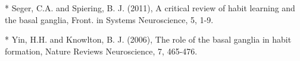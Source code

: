 * Seger, C.A. and Spiering, B. J. (2011), A critical review of habit learning
  and the basal ganglia, Front. in Systems Neuroscience, 5, 1-9.

* Yin, H.H. and Knowlton, B. J. (2006), The role of the basal ganglia in habit
  formation, Nature Reviews Neuroscience, 7, 465-476.





